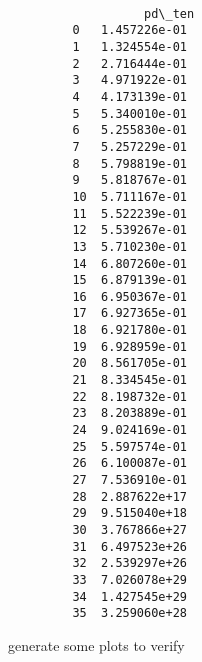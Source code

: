 \documentclass{article}
\begin{document}
\begin{Verbatim}[commandchars=\\\{\}]
                           
                   pd\_ten  
         0   1.457226e-01  
         1   1.324554e-01  
         2   2.716444e-01  
         3   4.971922e-01  
         4   4.173139e-01  
         5   5.340010e-01  
         6   5.255830e-01  
         7   5.257229e-01  
         8   5.798819e-01  
         9   5.818767e-01  
         10  5.711167e-01  
         11  5.522239e-01  
         12  5.539267e-01  
         13  5.710230e-01  
         14  6.807260e-01  
         15  6.879139e-01  
         16  6.950367e-01  
         17  6.927365e-01  
         18  6.921780e-01  
         19  6.928959e-01  
         20  8.561705e-01  
         21  8.334545e-01  
         22  8.198732e-01  
         23  8.203889e-01  
         24  9.024169e-01  
         25  5.597574e-01  
         26  6.100087e-01  
         27  7.536910e-01  
         28  2.887622e+17  
         29  9.515040e+18  
         30  3.767866e+27  
         31  6.497523e+26  
         32  2.539297e+26  
         33  7.026078e+29  
         34  1.427545e+29  
         35  3.259060e+28  
\end{Verbatim}
        
    generate some plots to verify
\end{document}
